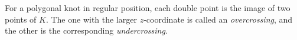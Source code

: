 For a polygonal knot in regular position, each double point is the image of two points of $K$. The one with the larger $z$-coordinate is called an \textit{overcrossing}, and the other is the corresponding \textit{undercrossing}.
